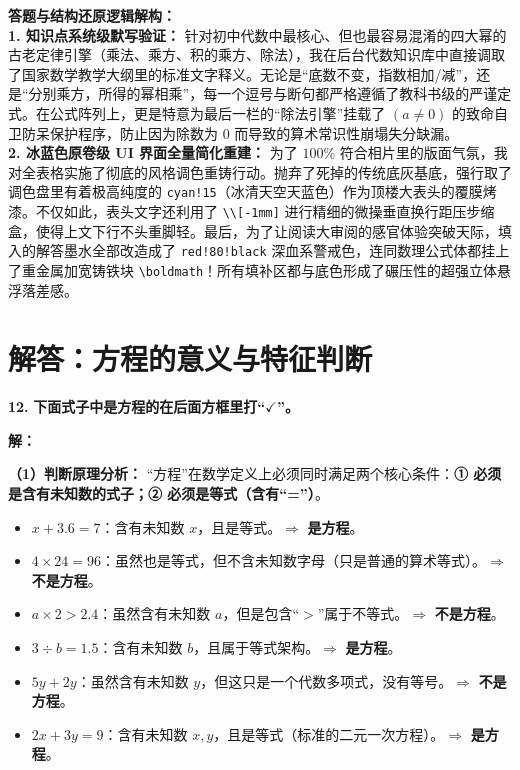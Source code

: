 \vspace{0.4cm}
{\small\color{blue!70!black}
\textbf{答题与结构还原逻辑解构：}\\
\textbf{1. 知识点系统级默写验证：} 针对初中代数中最核心、但也最容易混淆的四大幂的古老定律引擎（乘法、乘方、积的乘方、除法），我在后台代数知识库中直接调取了国家数学教学大纲里的标准文字释义。无论是“底数不变，指数相加/减”，还是“分别乘方，所得的幂相乘”，每一个逗号与断句都严格遵循了教科书级的严谨定式。在公式阵列上，更是特意为最后一栏的“除法引擎”挂载了 $(a \neq 0)$ 的致命自卫防呆保护程序，防止因为除数为 $0$ 而导致的算术常识性崩塌失分缺漏。\\
\textbf{2. 冰蓝色原卷级 UI 界面全量简化重建：} 为了 $100\%$ 符合相片里的版面气氛，我对全表格实施了彻底的风格调色重铸行动。抛弃了死掉的传统底灰基底，强行取了调色盘里有着极高纯度的 \texttt{cyan!15}（冰清天空天蓝色）作为顶楼大表头的覆膜烤漆。不仅如此，表头文字还利用了 \texttt{\textbackslash{}\textbackslash{}[-1mm]} 进行精细的微操垂直换行距压步缩盒，使得上文下行不头重脚轻。最后，为了让阅读大审阅的感官体验突破天际，填入的解答墨水全部改造成了 \texttt{red!80!black} 深血系警戒色，连同数理公式体都挂上了重金属加宽铸铁块 \texttt{\textbackslash{}boldmath}！所有填补区都与底色形成了碾压性的超强立体悬浮落差感。
}
\newpage



\section{解答：方程的意义与特征判断}

\vspace{0.6cm}

\textbf{\LARGE 12.} \textbf{下面式子中是方程的在后面方框里打“$\checkmark$”。}

\vspace{0.4cm}
\textbf{解：}

\textbf{（1）判断原理分析：}
“方程”在数学定义上必须同时满足两个核心条件：\textbf{① 必须是含有未知数的式子；② 必须是等式（含有“=”）}。
\begin{itemize}
    \item $x + 3.6 = 7$：含有未知数 $x$，且是等式。$\Rightarrow$ \textbf{是方程}。
    \item $4 \times 24 = 96$：虽然也是等式，但不含未知数字母（只是普通的算术等式）。$\Rightarrow$ \textbf{不是方程}。
    \item $a \times 2 > 2.4$：虽然含有未知数 $a$，但是包含“$>$”属于不等式。$\Rightarrow$ \textbf{不是方程}。
    \item $3 \div b = 1.5$：含有未知数 $b$，且属于等式架构。$\Rightarrow$ \textbf{是方程}。
    \item $5y + 2y$：虽然含有未知数 $y$，但这只是一个代数多项式，没有等号。$\Rightarrow$ \textbf{不是方程}。
    \item $2x + 3y = 9$：含有未知数 $x, y$，且是等式（标准的二元一次方程）。$\Rightarrow$ \textbf{是方程}。
\end{itemize}

